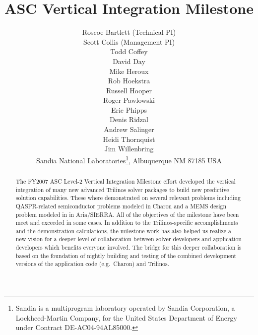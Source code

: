 \documentclass[pdf,ps2pdf,11pt]{SANDreport}
\title{\center
ASC Vertical Integration Milestone
}
\author{
Roscoe Bartlett (Technical PI) \\
Scott Collis (Management PI) \\
Todd Coffey \\
David Day \\
Mike Heroux \\
Rob Hoekstra \\
Russell Hooper \\
Roger Pawlowski \\
Eric Phipps \\
Denis Ridzal \\
Andrew Salinger \\
Heidi Thornquist \\
Jim Willenbring \\
Sandia National
Laboratories\footnote{ Sandia is a multiprogram laboratory operated by Sandia
Corporation, a Lockheed-Martin Company, for the United States Department of
Energy under Contract DE-AC04-94AL85000.}, Albuquerque NM 87185 USA
}
\begin{document}
\maketitle

%


%
\begin{abstract}
%

The FY2007 ASC Level-2 Vertical Integration Milestone effort developed the
vertical integration of many new advanced Trilinos solver packages to build
new predictive solution capabilities.  These where demonstrated on several
relevant problems including QASPR-related semiconductor problems modeled in
Charon and a MEMS design problem modeled in in Aria/SIERRA.  All of the objectives of the
milestone have been meet and exceeded in some cases.  In addition to the
Trilinos-specific accomplishments and the demonstration calculations, the
milestone work has also helped us realize a new vision for a deeper level of
collaboration between solver developers and application developers which
benefits everyone involved.  The bridge for this deeper collaboration is based
on the foundation of nightly building and testing of the combined development versions
of the application code (e.g.\ Charon) and Trilinos.

%

%
\end{abstract}
%

%
%
%
\end{document}
